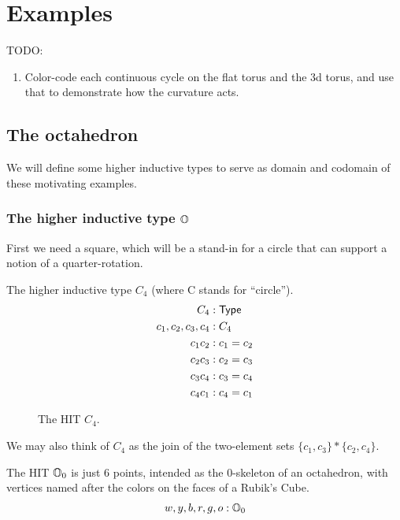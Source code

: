 \section{Examples}

TODO:
\begin{enumerate}
\item Color-code each continuous cycle on the flat torus and the 3d torus, and use that to demonstrate how the curvature acts.
\end{enumerate}
\subsection{The octahedron}

We will define some higher inductive types to serve as domain and codomain of these motivating examples.

\subsubsection{The higher inductive type \( \mathbb{O} \)}

First we need a square, which will be a stand-in for a circle that can support a notion of a quarter-rotation. 

\begin{mydef}
The higher inductive type \( C_4 \) (where C stands for ``circle'').
\begin{align*}
C_4 &: \mathsf{Type} \\
c_1, c_2, c_3, c_4 &: C_4 \\
c_1c_2 &: c_1 = c_2 \\
c_2c_3 &: c_2 = c_3 \\
c_3c_4 &: c_3 = c_4 \\
c_4c_1 &: c_4 = c_1 \\
\end{align*}
\end{mydef}

\begin{figure}[h]
\centering

\caption{The HIT \( C_4 \).}
\end{figure}

We may also think of \( C_4 \) as the join of the two-element sets \( \{c_1, c_3\}* \{c_2, c_4\} \).

\begin{mydef}
The HIT \( \mathbb{O}_0 \) is just 6 points, intended as the 0-skeleton of an octahedron, with vertices named after the colors on the faces of a Rubik's Cube.
\[ w, y, b, r, g, o : \mathbb{O}_0 \]
\end{mydef}

